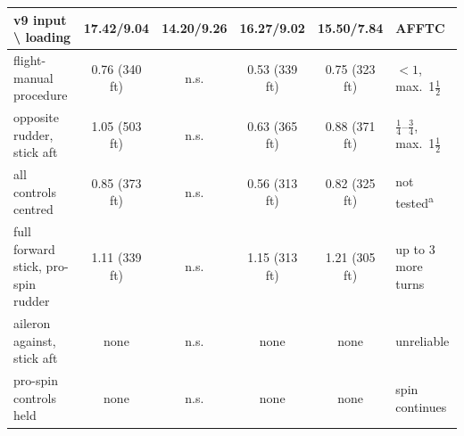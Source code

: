 \begin{tabular}{lccccl}
\toprule
v9 input \textbackslash{} loading & 17.42/9.04 & 14.20/9.26 & 16.27/9.02 & 15.50/7.84 & AFFTC \\
\midrule
flight-manual procedure & 0.76 (340 ft) & n.s. & 0.53 (339 ft) & 0.75 (323 ft) & $<1$, max.\ 1$\frac12$ \\
opposite rudder, stick aft & 1.05 (503 ft) & n.s. & 0.63 (365 ft) & 0.88 (371 ft) & $\frac14$--$\frac34$, max.\ 1$\frac12$ \\
all controls centred & 0.85 (373 ft) & n.s. & 0.56 (313 ft) & 0.82 (325 ft) & not tested\textsuperscript{a} \\
full forward stick, pro-spin rudder & 1.11 (339 ft) & n.s. & 1.15 (313 ft) & 1.21 (305 ft) & up to 3 more turns \\
aileron against, stick aft & none & n.s. & none & none & unreliable \\
pro-spin controls held & none & n.s. & none & none & spin continues \\
\bottomrule
\end{tabular}
